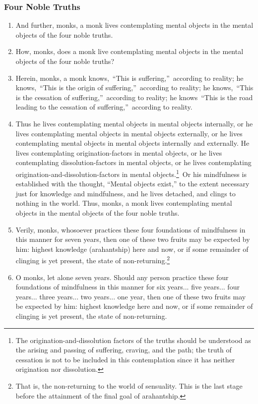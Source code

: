 \documentclass[a4 paper, 12pt]{article}
\begin{document}
\subsubsection*{Four Noble Truths}
\begin{enumerate}[resume]
\item And further, monks, a monk lives contemplating mental objects in the mental objects of the four noble truths.
\item How, monks, does a monk live contemplating mental objects in the mental objects of the four noble truths?
\item Herein, monks, a monk knows, “This is suffering,” according to reality; he knows, “This is the origin of suffering,” according to reality; he knows, “This is the cessation of suffering,” according to reality; he knows “This is the road leading to the cessation of suffering,” according to reality.
\item Thus he lives contemplating mental objects in mental objects internally, or he lives contemplating mental objects in mental objects externally, or he lives contemplating mental objects in mental objects internally and externally. He lives contemplating origination-factors in mental objects, or he lives contemplating dissolution-factors in mental objects, or he lives contemplating origination-and-dissolution-factors in mental objects.\footnote{The origination-and-dissolution factors of the truths should be understood as the arising and passing of suffering, craving, and the path; the truth of cessation is not to be included in this contemplation since it has neither origination nor dissolution.} Or his mindfulness is established with the thought, “Mental objects exist,” to the extent necessary just for knowledge and mindfulness, and he lives detached, and clings to nothing in the world. Thus, monks, a monk lives contemplating mental objects in the mental objects of the four noble truths.
\item Verily, monks, whosoever practices these four foundations of mindfulness in this manner for seven years, then one of these two fruits may be expected by him: highest knowledge (arahantship) here and now, or if some remainder of clinging is yet present, the state of non-returning.\footnote{That is, the non-returning to the world of sensuality. This is the last stage before the attainment of the final goal of arahantship.}
\item O monks, let alone seven years. Should any person practice these four foundations of mindfulness in this manner for six years... five years... four years... three years... two years... one year, then one of these two fruits may be expected by him: highest knowledge here and now, or if some remainder of clinging is yet present, the state of non-returning.

\end{enumerate}
\end{document}

